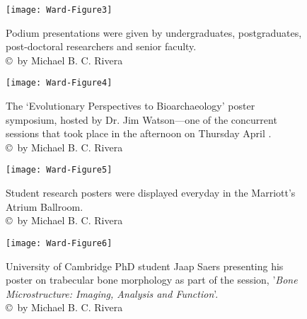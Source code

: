 \documentclass[english]{ijsra}
\def\authortwo{Michael B. C. Rivera}
\begin{document}
\begin{figure}[!htb] %
		\centering
		\texttt{[image: Ward-Figure3]}
		\caption{Podium presentations were given by undergraduates, postgraduates, post-doctoral researchers and senior faculty. 
		{\normalfont\scriptsize \\ \copyright\ by \authortwo}}
		\label{fig:Ward-Figure3}
	\end{figure}
	
	\begin{figure}[!htb] %
		\centering
		\texttt{[image: Ward-Figure4]}
		\caption{The ‘Evolutionary Perspectives to Bioarchaeology’ poster symposium, hosted by Dr. Jim Watson—one of the concurrent sessions that took place in the afternoon on Thursday April . 
		{\normalfont\scriptsize \\ \copyright\ by \authortwo}}
		\label{fig:Ward-Figure4}
	\end{figure}
	
	\begin{figure}[!htb] %
		\centering
		\texttt{[image: Ward-Figure5]}
		\caption{Student research posters were displayed everyday in the Marriott's Atrium Ballroom. 
		{\normalfont\scriptsize \\ \copyright\ by \authortwo}}
		\label{fig:Ward-Figure5}
	\end{figure}
	
	\begin{figure}[!htb] %
		\centering
		\texttt{[image: Ward-Figure6]}
		\caption{University of Cambridge PhD student Jaap Saers presenting his poster on trabecular bone morphology as part of the session, '\emph{Bone Microstructure: Imaging, Analysis and Function}'.
				{\normalfont\scriptsize \\ \copyright\ by \authortwo}}
		\label{fig:Ward-Figure6}
	\end{figure}
\end{document}
